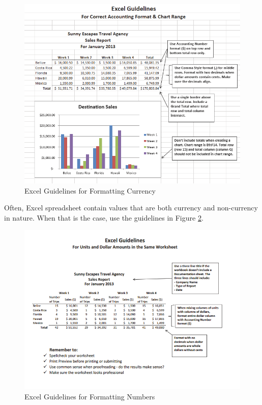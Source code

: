 \begin{figure}[H]
	\centering
	\includegraphics[width=\maxwidth{.95\linewidth}]{gfx/ch01_fig32}
	\caption{Excel Guidelines for Formatting Currency}
	\label{01:fig32}
\end{figure}

Often, Excel spreadsheet contain values that are both currency and non-currency in nature. When that is the case, use the guidelines in Figure \ref{01:fig33}.

\begin{figure}[H]
	\centering
	\includegraphics[width=\maxwidth{.95\linewidth}]{gfx/ch01_fig33}
	\caption{Excel Guidelines for Formatting Numbers}
	\label{01:fig33}
\end{figure}

